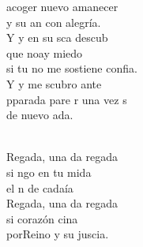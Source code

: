 \documentclass[12pt]{article}
\begin{document}
\begin{multicols*}{2}
\begin{cancion}[Regalada][Ixcís]
	acoger nuevo amanecer\\
	y su an con alegría. \\
	Y y en su sca descub\\
	que noay miedo\\
	si tu no me sostiene confia.\\
	Y y me scubro ante\\
	pparada pare r una vez s \\
	de nuevo ada.\\\jump\\
	\begin{chorus}%
	Regada, una da regada\\
	si ngo en tu mida \\
	el n de cadaía\\
	Regada, una da regada\\
	si  corazón cina \\
	porReino y su juscia.\\
	\end{chorus}%
	\jump\\
\end{cancion}%


\end{multicols*}
\end{document}

